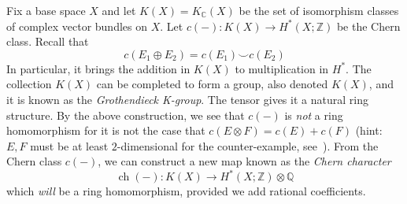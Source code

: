 \documentclass{ut-thesis}
\newcommand{\Q}{{\mathbb{Q}}}
\newcommand{\Z}{{\mathbb{Z}}}
\newcommand{\C}{{\mathbb{C}}}
\newcommand{\ch}{{\operatorname{ch}}}
\renewcommand{\ch}{{\operatorname{ch}}}
\begin{document}
Fix a base space $X$ and let $K(X) = K_\C(X)$ be the set of isomorphism classes of complex vector bundles on
$X$. Let $c(-): K(X) \to H^*(X; \Z)$ be the Chern class. Recall that
\[
  c(E_1\oplus E_2) = c(E_1)\smile c(E_2)
\]
In particular, it brings the addition in $K(X)$ to multiplication in $H^*$. The collection $K(X)$ can be
completed to form a group, also denoted $K(X)$, and it is known as the \emph{Grothendieck K-group}. The tensor
gives it a natural ring structure. By the above construction, we see that $c(-)$ is \emph{not} a ring
homomorphism for it is not the case that $c(E\otimes F) = c(E) + c(F)$ (hint: $E,F$ must be at least
$2$-dimensional for the counter-example, see~\cite{NateKTheory}). From the Chern class $c(-)$, we can construct a new map known as the \emph{Chern character}
\[
  \ch(-): K(X) \to H^*(X; \Z)\otimes \Q
\]
which \emph{will} be a ring homomorphism, provided we add rational coefficients.
\end{document}
